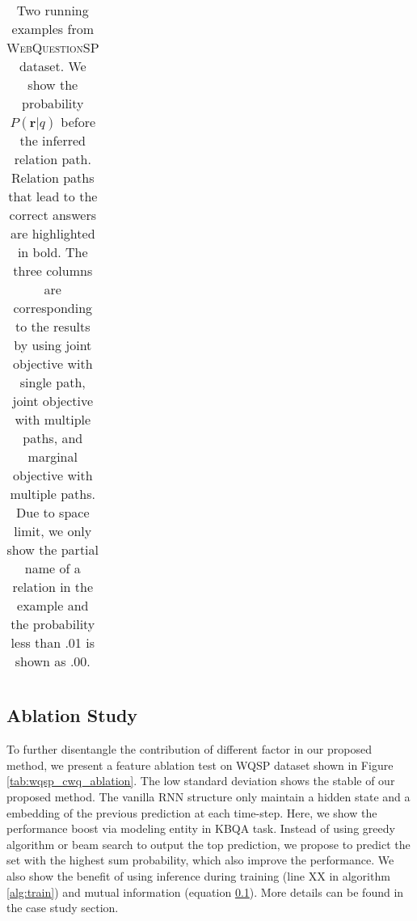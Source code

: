 \begin{table*}[t]
{\begin{tabular}{l|l|l}
\end{tabular}
}\caption{\fontsize{10}{12}\selectfont Two running examples from \textsc{WebQuestionSP} dataset. We show the probability $P(\mathbf{r}|q)$ before the inferred relation path. Relation paths that lead to the correct answers are highlighted in bold. The three columns are corresponding to the results by using joint objective with single path, joint objective with multiple paths, and marginal objective with multiple paths. Due to space limit, we only show the partial name of a relation in the example and the probability less than .01 is shown as .00.}\label{tab:case}
\end{table*}



\subsection{Ablation Study}

\begin{table}[h]\centering
{}
\caption{\fontsize{10}{12}\selectfont We report F1 and standard deviation. \textsc{BEST} represents XXX.}\label{tab:wqsp_cwq_ablation}
\end{table}

To further disentangle the contribution of different factor in our proposed method, we present a feature ablation test on WQSP dataset shown in Figure \ref{tab:wqsp_cwq_ablation}. The low standard deviation shows the stable of our proposed method. The vanilla RNN structure only maintain a hidden state and a embedding of the previous prediction at each time-step. Here, we show the performance boost via modeling entity in KBQA task. Instead of using greedy algorithm or beam search to output the top prediction, we propose to predict the set with the highest sum probability, which also improve the performance. We also show the benefit of using inference during training (line XX in algorithm \ref{alg:train}) and mutual information (equation \ref{}). More details can be found in the case study section. 

